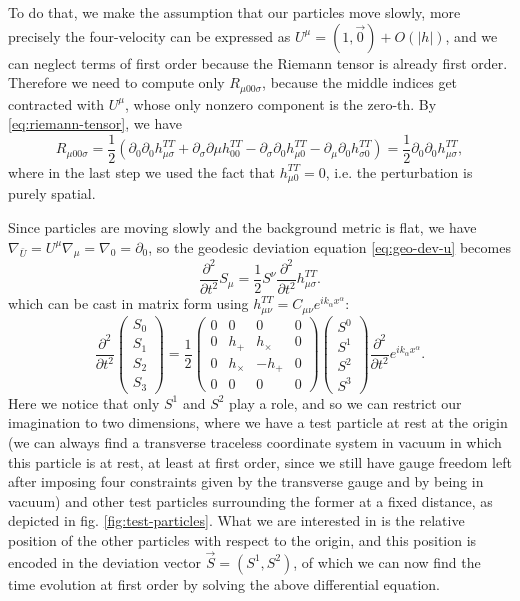\documentclass[a4paper]{article}
\begin{document}
To do that, we make the assumption that our particles move slowly, more precisely the four-velocity can be expressed as $U^{\mu} = (1, \vec{0}) + O(|h|)$, and we can neglect terms of first order because the Riemann tensor is already first order. Therefore we need to compute only $R_{\mu 0 0 \sigma}$, because the middle indices get contracted with $U^{\mu}$, whose only nonzero component is the zero-th. By \eqref{eq:riemann-tensor}, we have
$$R_{\mu 0 0 \sigma} = \frac{1}{2}(\partial_0\partial_0 h^{TT}_{\mu\sigma} + \partial_{\sigma}\partial{\mu}h^{TT}_{00} - \partial_{\sigma}\partial_0h^{TT}_{\mu 0} - \partial_{\mu}\partial_0h^{TT}_{\sigma 0}) = \frac{1}{2}\partial_0\partial_0h^{TT}_{\mu\sigma},$$
where in the last step we used the fact that $h^{TT}_{\mu 0} = 0$, i.e. the perturbation is purely spatial.

Since particles are moving slowly and the background metric is flat, we have $\nabla_{\bar{U}} = U^{\mu}\nabla_{\mu} = \nabla_0 = \partial_0$, so the geodesic deviation equation \eqref{eq:geo-dev-u} becomes
\begin{equation}
  \frac{\partial^2}{\partial t^2}S_{\mu} = \frac{1}{2} S^{\nu}\frac{\partial^2}{\partial t^2}h^{TT}_{\mu\sigma}.
\end{equation}
which can be cast in matrix form using $h^{TT}_{\mu\nu} = C_{\mu\nu}e^{ik_{\alpha}x^{\alpha}}$:
\begin{equation}
  \frac{\partial^2}{\partial t^2}\begin{pmatrix}
    S_0\\
    S_1\\
    S_2\\
    S_3
  \end{pmatrix} = \frac{1}{2} \begin{pmatrix}
    0 & 0 & 0 & 0\\
    0 & h_{+} & h_{\times} & 0\\
    0 & h_{\times} & -h_{+} & 0\\
    0 & 0 & 0 & 0
  \end{pmatrix} \begin{pmatrix}
    S^0\\
    S^1\\
    S^2\\
    S^3
  \end{pmatrix}\frac{\partial^2}{\partial t^2} e^{ik_{\alpha}x^{\alpha}}.
  \label{eq:matrix-eq}
\end{equation}
Here we notice that only $S^1$ and $S^2$ play a role, and so we can restrict our imagination to two dimensions, where we have a test particle at rest at the origin (we can always find a transverse traceless coordinate system in vacuum in which this particle is at rest, at least at first order, since we still have gauge freedom left after imposing four constraints given by the transverse gauge and by being in vacuum) and other test particles surrounding the former at a fixed distance, as depicted in fig. \ref{fig:test-particles}. What we are interested in is the relative position of the other particles with respect to the origin, and this position is encoded in the deviation vector $\vec{S} = (S^1, S^2)$, of which we can now find the time evolution at first order by solving the above differential equation.
\end{document}
